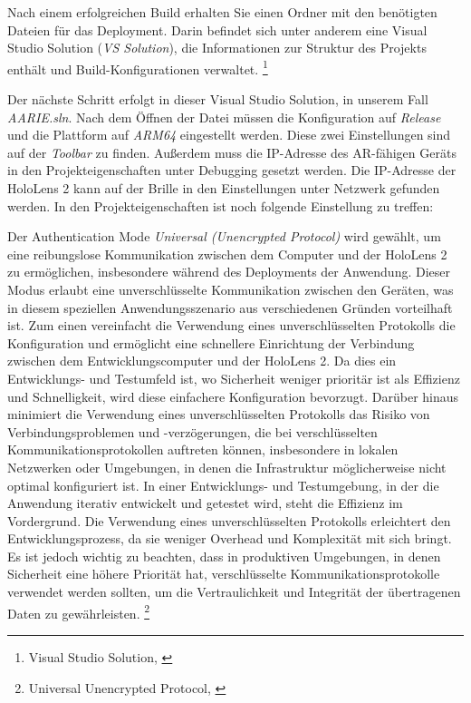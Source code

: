 Nach einem erfolgreichen Build erhalten Sie einen Ordner mit den benötigten Dateien für das Deployment. Darin befindet sich unter anderem eine Visual Studio Solution (\textit{VS Solution}), die Informationen zur Struktur des Projekts enthält und Build-Konfigurationen verwaltet. \footnote{Visual Studio Solution, \cite{VS-Solution}}

Der nächste Schritt erfolgt in dieser Visual Studio Solution, in unserem Fall \textit{AARIE.sln}. Nach dem Öffnen der Datei müssen die Konfiguration auf \textit{Release} und die Plattform auf \textit{ARM64} eingestellt werden. Diese zwei Einstellungen sind auf der \textit{Toolbar} zu finden. Außerdem muss die IP-Adresse des AR-fähigen Geräts in den Projekteigenschaften unter Debugging gesetzt werden. Die IP-Adresse der HoloLens 2 kann auf der Brille in den Einstellungen unter Netzwerk gefunden werden. In den Projekteigenschaften ist noch folgende Einstellung zu treffen:

Der Authentication Mode \textit{Universal (Unencrypted Protocol)} wird gewählt, um eine reibungslose Kommunikation zwischen dem Computer und der HoloLens 2 zu ermöglichen, insbesondere während des Deployments der Anwendung. Dieser Modus erlaubt eine unverschlüsselte Kommunikation zwischen den Geräten, was in diesem speziellen Anwendungsszenario aus verschiedenen Gründen vorteilhaft ist. Zum einen vereinfacht die Verwendung eines unverschlüsselten Protokolls die Konfiguration und ermöglicht eine schnellere Einrichtung der Verbindung zwischen dem Entwicklungscomputer und der HoloLens 2. Da dies ein Entwicklungs- und Testumfeld ist, wo Sicherheit weniger prioritär ist als Effizienz und Schnelligkeit, wird diese einfachere Konfiguration bevorzugt. Darüber hinaus minimiert die Verwendung eines unverschlüsselten Protokolls das Risiko von Verbindungsproblemen und -verzögerungen, die bei verschlüsselten Kommunikationsprotokollen auftreten können, insbesondere in lokalen Netzwerken oder Umgebungen, in denen die Infrastruktur möglicherweise nicht optimal konfiguriert ist. In einer Entwicklungs- und Testumgebung, in der die Anwendung iterativ entwickelt und getestet wird, steht die Effizienz im Vordergrund. Die Verwendung eines unverschlüsselten Protokolls erleichtert den Entwicklungsprozess, da sie weniger Overhead und Komplexität mit sich bringt. Es ist jedoch wichtig zu beachten, dass in produktiven Umgebungen, in denen Sicherheit eine höhere Priorität hat, verschlüsselte Kommunikationsprotokolle verwendet werden sollten, um die Vertraulichkeit und Integrität der übertragenen Daten zu gewährleisten. \footnote{Universal Unencrypted Protocol, \cite{VS-Protocol}}

